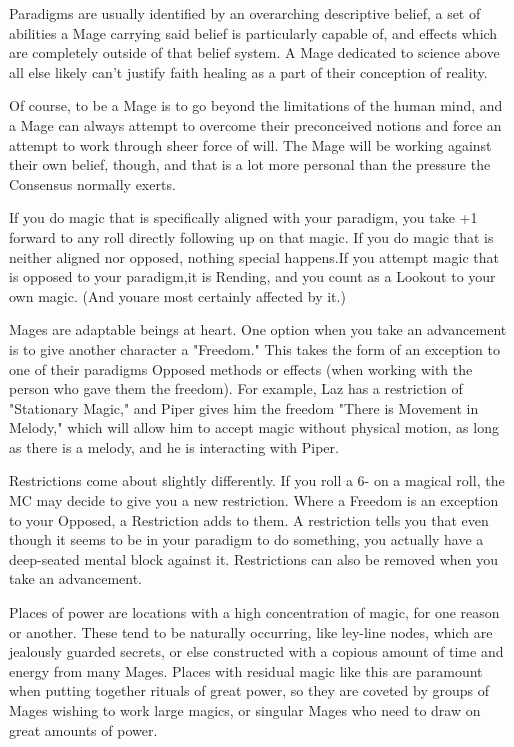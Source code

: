 \documentclass[letterpaper,12pt]{article}
\newcommand{\SECTION}[1]{\vspace{.5em}{\noindent\titlefont\large\textbf{#1}}

}
\begin{document}
Paradigms are usually identified by an overarching descriptive belief,
a set of abilities a Mage carrying said belief is particularly capable
of, and effects which are completely outside of that belief system. A
Mage dedicated to science above all else likely can't justify faith
healing as a part of their conception of reality.

Of course, to be a Mage is to go beyond the limitations of the human
mind, and a Mage can always attempt to overcome their preconceived
notions and force an attempt to work through sheer force of will. The
Mage will be working against their own belief, though, and that is a
lot more personal than the pressure the Consensus normally exerts.

If you do magic that is specifically aligned with your paradigm, you
take +1 forward to any roll directly following up on that magic. If you
do magic that is neither aligned nor opposed, nothing special happens.If 
you attempt magic that is opposed to your paradigm,it is Rending, and 
you count as a Lookout to your own magic. (And youare most certainly 
affected by it.)

\SECTION{Freedoms and Restrictions}
Mages are adaptable beings at heart. One option when you take an
advancement is to give another character a "Freedom." This takes the
form of an exception to one of their paradigms Opposed methods or 
effects (when working with the person who gave them the freedom). 
For example, Laz has a restriction of "Stationary Magic," and Piper
gives him the freedom "There is Movement in Melody," which will allow
him to accept magic without physical motion, as long as there is a 
melody, and he is interacting with Piper.

Restrictions come about slightly differently. If you roll a 6- on a
magical roll, the MC may decide to give you a new restriction. Where a
Freedom is an exception to your Opposed, a Restriction adds to them. 
A restriction tells you that even though it seems to be in your paradigm 
to do something, you actually have a deep-seated mental block against it.
Restrictions can also be removed when you take an advancement.

\SECTION{Place of Power}
Places of power are locations with a high concentration of magic, for
one reason or another. These tend to be naturally occurring, like
ley-line nodes, which are jealously guarded secrets, or else
constructed with a copious amount of time and energy from many
Mages. Places with residual magic like this are paramount when putting
together rituals of great power, so they are coveted by groups of
Mages wishing to work large magics, or singular Mages who need to draw
on great amounts of power.
\end{document}
